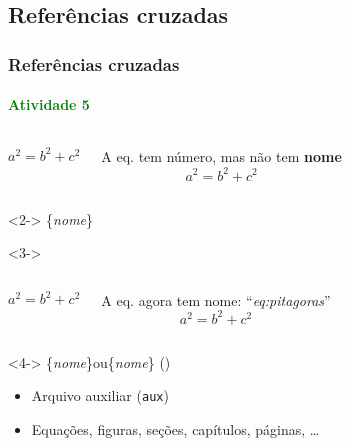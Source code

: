 \documentclass[handout,10pt]{beamer}
\begin{document}
\subsection{Referências cruzadas}
\begin{frame}[fragile]
	\frametitle{Referências cruzadas}
	\framesubtitle{\textcolor{green}{Atividade 5}}
		
	\begin{columns}
		\begin{LaTeXcode}
			\begin{equation}
			  a^2 = b^2 + c^2
			\end{equation}		
		\end{LaTeXcode}
		\small A eq. tem número, mas não tem \textbf{nome}			
		\begin{equation}
		  \label{eq:pitagoras}
		  a^2 = b^2 + c^2
		\end{equation}		
	\end{columns}
	
	\vspace*{\stretch{1}}
	
	\begin{block}<2->{}
		\centering
		\{\alert<2>{\textit{nome}}\}
	\end{block}
	
	\vspace*{\stretch{1}}
	
	\begin{uncoverenv}<3->
		\begin{columns}
			\column[T]{0.35\textwidth}
			\begin{LaTeXcode}
				\begin{equation}
				\label{eq:pitagoras}
				a^2 = b^2 + c^2
				\end{equation}		
			\end{LaTeXcode}
			\column[T]{0.60\textwidth}		
			 A eq. agora tem nome: ``\textit{eq:pitagoras}''
			\begin{equation}
			\label{eq:pitagoras}
			a^2 = b^2 + c^2
			\end{equation}		
		\end{columns}
	\end{uncoverenv}
	
	
	\begin{block}<4->{}
		\centering
		\hfill{}\{\alert<4>{\textit{nome}}\}\hfill ou\hfill {}\{\alert<4>{\textit{nome}}\} ()\hfill{}
	\end{block}
	
	
	\begin{itemize}
		\item<5-> Arquivo auxiliar (\texttt{aux})
		\item<6-> Equações, figuras, seções, capítulos, páginas, \dots
	\end{itemize}
	
\end{frame}
\end{document}
